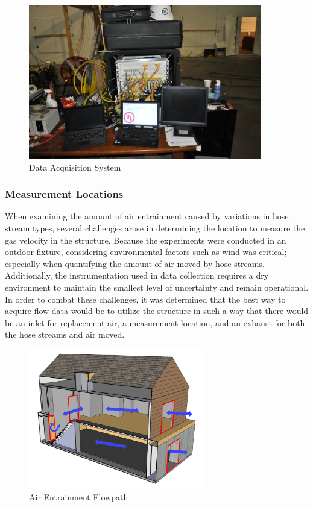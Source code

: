 \documentclass{article}
\begin{document}
\begin{figure}[H]
	\centering
	\includegraphics[width = 4in]{../0_Images/Instrumentation/DataSystem.jpg}
	\caption{Data Acquisition System}
	\label{fig:DataSystem}
\end{figure}

\clearpage

\subsubsection{Measurement Locations}

When examining the amount of air entrainment caused by variations in hose stream types, several challenges arose in determining the location to measure the gas velocity in the structure. Because the experiments were conducted in an outdoor fixture, considering environmental factors such as wind was critical; especially when quantifying the amount of air moved by hose streams. Additionally, the instrumentation used in data collection requires a dry environment to maintain the smallest level of uncertainty and remain operational. In order to combat these challenges, it was determined that the best way to acquire flow data would be to utilize the structure in such a way that there would be an inlet for replacement air, a measurement location, and an exhaust for both the hose streams and air moved. 

\begin{figure}[!ht]
	\centering
	\includegraphics[width=3in]{Figures/Air_Entrainment/Airflow_flowpath.png}
	\caption{Air Entrainment Flowpath}
	\label{fig:Air_Entrainment_Flowpath}
\end{figure}
\end{document}
